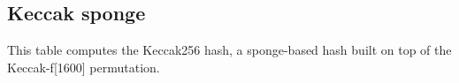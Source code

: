 \subsection{Keccak sponge}
\label{keccak-sponge}

This table computes the Keccak256 hash, a sponge-based hash built on top of the Keccak-f[1600] permutation.
